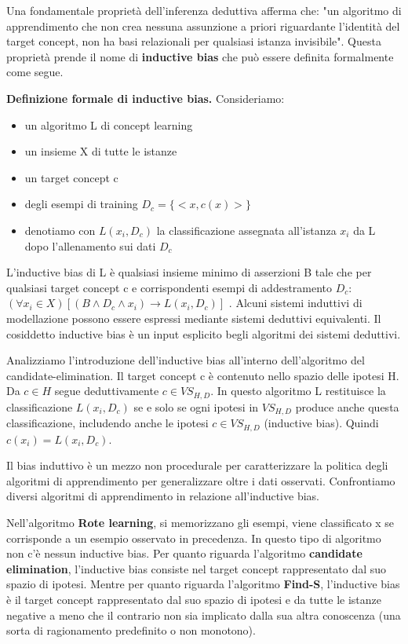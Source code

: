 \documentclass[a4paper]{extarticle}
\begin{document}
Una fondamentale proprietà dell'inferenza deduttiva afferma che: "un algoritmo di apprendimento che non crea nessuna assunzione a priori riguardante l'identità del target concept, non ha basi relazionali per qualsiasi istanza invisibile". Questa proprietà prende il nome di \textbf{inductive bias} che può essere definita formalmente come segue.

\textbf{Definizione formale di inductive bias.} Consideriamo:
\begin{itemize}
\item un algoritmo L di concept learning
\item un insieme X di tutte le istanze
\item un target concept c
\item degli esempi di training $D_c = \{ <x,c(x)>\}$
\item denotiamo con $L(x_i,D_c)$ la classificazione assegnata all'istanza $x_i$ da L dopo l'allenamento sui dati $D_c$
\end{itemize}

L'inductive bias di L è qualsiasi insieme minimo di asserzioni B tale che per qualsiasi target concept c e corrispondenti esempi di addestramento $D_c$: $(\forall x_i \in X) [( B \wedge D_c \wedge x_i ) \rightarrow L(x_i,D_c)]$ . Alcuni sistemi induttivi di modellazione possono essere espressi mediante sistemi deduttivi equivalenti. Il cosiddetto inductive bias è un input esplicito begli algoritmi dei sistemi deduttivi.

Analizziamo l'introduzione dell'inductive bias all'interno dell'algoritmo del candidate-elimination. Il target concept c è contenuto nello spazio delle ipotesi H. Da $c \in H$ segue deduttivamente $ c \in  VS_{H,D}$. In questo algoritmo L restituisce la classificazione $L(x_i,D_c)$ se e solo se ogni ipotesi in $VS_{H,D}$ produce anche questa classificazione, includendo anche le ipotesi $c \in VS_{H,D}$ (inductive bias). Quindi $c(x_i)=L(x_i,D_c)$.

Il bias induttivo è un mezzo non procedurale per caratterizzare la politica degli algoritmi di apprendimento per generalizzare oltre i dati osservati. Confrontiamo diversi algoritmi di apprendimento in relazione all'inductive bias. 

Nell'algoritmo \textbf{Rote learning}, si memorizzano gli esempi, viene classificato x se corrisponde a un esempio osservato in precedenza. In questo tipo di algoritmo non c'è nessun inductive bias. Per quanto riguarda l'algoritmo \textbf{candidate elimination}, l'inductive bias consiste nel target concept rappresentato dal suo spazio di ipotesi. Mentre per quanto riguarda l'algoritmo \textbf{Find-S}, l'inductive bias è il target concept rappresentato dal suo spazio di ipotesi e da tutte le istanze negative a meno che il contrario non sia implicato dalla sua altra conoscenza (una sorta di ragionamento predefinito o non monotono). 
\end{document}
